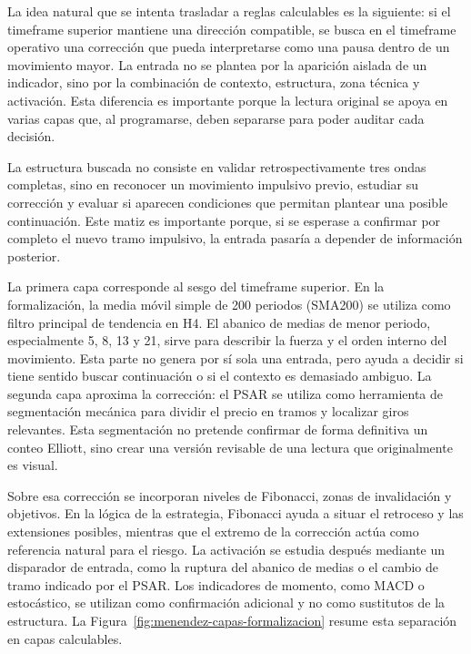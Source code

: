 La idea natural que se intenta trasladar a reglas calculables es la siguiente:
si el timeframe superior mantiene una direcci\'on compatible, se busca en el timeframe
operativo una correcci\'on que pueda interpretarse como una pausa dentro de un
movimiento mayor. La entrada no se plantea por la aparici\'on aislada de un
indicador, sino por la combinaci\'on de contexto, estructura, zona t\'ecnica y
activaci\'on. Esta diferencia es importante porque la lectura original se apoya
en varias capas que, al programarse, deben separarse para poder auditar cada
decisi\'on.

La estructura buscada no consiste en validar retrospectivamente tres ondas
completas, sino en reconocer un movimiento impulsivo previo, estudiar su
correcci\'on y evaluar si aparecen condiciones que permitan plantear una posible
continuaci\'on. Este matiz es importante porque, si se esperase a confirmar por
completo el nuevo tramo impulsivo, la entrada pasar\'ia a depender de informaci\'on
posterior.

La primera capa corresponde al sesgo del timeframe superior. En la formalizaci\'on,
la media m\'ovil simple de 200 periodos (SMA200) se utiliza como filtro principal
de tendencia en H4. El abanico de medias de menor periodo, especialmente 5, 8,
13 y 21, sirve para describir la fuerza y el orden interno del movimiento. Esta parte no genera por s\'i sola una entrada, pero ayuda a
decidir si tiene sentido buscar continuaci\'on o si el contexto es demasiado
ambiguo. La segunda capa aproxima la correcci\'on: el PSAR se utiliza como
herramienta de segmentaci\'on mec\'anica para dividir el precio en
tramos y localizar giros relevantes. Esta segmentaci\'on no pretende confirmar de
forma definitiva un conteo Elliott, sino crear una versi\'on revisable de una
lectura que originalmente es visual.

Sobre esa correcci\'on se incorporan niveles de Fibonacci, zonas de invalidaci\'on
y objetivos. En la l\'ogica de la estrategia, Fibonacci ayuda a situar el
retroceso y las extensiones posibles, mientras que el extremo de la correcci\'on
act\'ua como referencia natural para el riesgo. La activaci\'on se estudia despu\'es
mediante un disparador de entrada, como la ruptura del abanico de medias o el
cambio de tramo indicado por el PSAR. Los indicadores de momento, como MACD o
estoc\'astico, se utilizan como confirmaci\'on adicional y no como sustitutos de
la estructura.
La Figura~\ref{fig:menendez-capas-formalizacion} resume esta separaci\'on en
capas calculables.

